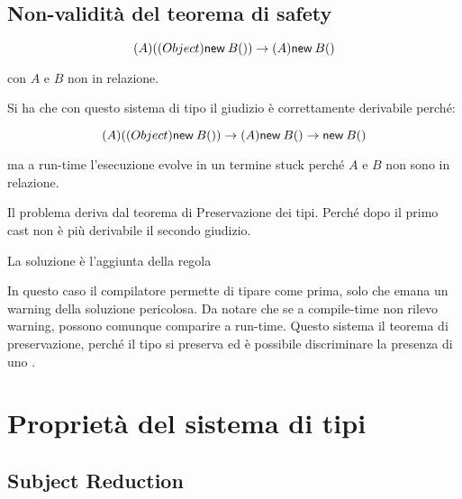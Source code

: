 \begin{prooftree}
	
	
\end{prooftree}

\subsection{Non-validità del teorema di safety}

$$
(A) ((Object)\new{B}{}) \to (A) \new{B}{}
$$

\noindent con $A$ e $B$ non in relazione.

Si ha che con questo sistema di tipo il giudizio è correttamente derivabile perché:

$$
(A) ((Object)\new{B}{}) \to (A) \new{B}{}  \to \new{B}{}
$$

\noindent ma a run-time l'esecuzione evolve in un termine stuck perché $A$ e $B$ non sono in relazione.

Il problema deriva dal teorema di Preservazione dei tipi. Perché dopo il primo cast non è più derivabile il secondo giudizio.

La soluzione è l'aggiunta della regola

\begin{prooftree}
	   
\end{prooftree}

In questo caso il compilatore permette di tipare come prima, solo che emana un warning della soluzione pericolosa. 
Da notare che se a compile-time non rilevo warning, possono comunque comparire a run-time.
Questo sistema il teorema di preservazione, perché il tipo si preserva ed è possibile discriminare la presenza di uno .


\section{Proprietà del sistema di tipi}

\subsection{Subject Reduction}

